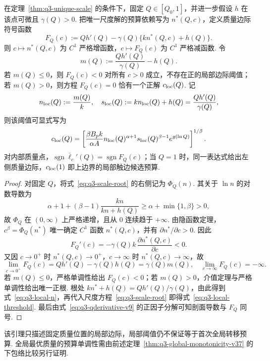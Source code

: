 \begin{lemma}[固定质量边际的预算单调性与局部阈值]\label{lem:q3-fixed-quality-threshold}
在定理~\ref{thm:q3-unique-scale} 的条件下，固定 $Q\in[Q_0,1]$，并进一步假设 $h$ 在该点可微且 $\gamma(Q)>0$. 把唯一尺度解的预算依赖写为 $n^*(Q,c)$，定义质量边际符号函数
\begin{equation}\label{eq:q3-fixed-q-margin}
F_Q(c):=Qh'(Q)-\gamma(Q)\{kn^*(Q,c)+h(Q)\}.
\end{equation}
则 $c\mapsto n^*(Q,c)$ 为 $C^1$ 严格增函数，$c\mapsto F_Q(c)$ 为 $C^1$ 严格减函数. 令
\begin{equation}\label{eq:q3-local-margin-m}
m(Q):=\frac{Qh'(Q)}{\gamma(Q)}-h(Q).
\end{equation}
若 $m(Q)\le0$，则 $F_Q(c)<0$ 对所有 $c>0$ 成立，不存在正的局部边际阈值；若 $m(Q)>0$，则方程 $F_Q(c)=0$ 恰有一个正解 $c_{\rm loc}(Q)$. 记
\begin{equation}\label{eq:q3-local-n}
n_{\rm loc}(Q):=\frac{m(Q)}k,\quad
s_{\rm loc}(Q):=kn_{\rm loc}(Q)+h(Q)=\frac{Qh'(Q)}{\gamma(Q)},
\end{equation}
则该阈值可显式写为
\begin{equation}\label{eq:q3-local-threshold}
c_{\rm loc}(Q)=\left[
\frac{\beta B_pk}{\alpha A}
 n_{\rm loc}(Q)^{\alpha+1}
 s_{\rm loc}(Q)^{\beta-1}
 e^{g(\ln Q)}
\right]^{1/\beta}.
\end{equation}
对内部质量点，$\operatorname{sgn}\bar\ell_c'(Q)=\operatorname{sgn}F_Q(c)$；当 $Q=1$ 时，同一表达式给出左侧质量边际，$c_{\rm loc}(1)$ 即上边界的局部触边候选预算. 
\end{lemma}
\begin{proof}
对固定 $Q$，将式~\eqref{eq:q3-scale-root} 的右侧记为 $\Phi_Q(n)$. 其关于 $\ln n$ 的对数导数为
\[
\alpha+1+(\beta-1)\frac{kn}{kn+h(Q)}
\ge \alpha+\min\{1,\beta\}>0,
\]
故 $\Phi_Q$ 在 $(0,\infty)$ 上严格递增，且从 $0$ 连续趋于 $+\infty$. 由隐函数定理，$c^\beta=\Phi_Q(n^*)$ 唯一确定 $C^1$ 函数 $n^*(Q,c)$，并有 $\partial n^*/\partial c>0$. 因此
\[
F_Q'(c)=-\gamma(Q)k\,\frac{\partial n^*(Q,c)}{\partial c}<0.
\]
又因 $c\to0^+$ 时 $n^*(Q,c)\to0^+$，$c\to\infty$ 时 $n^*(Q,c)\to\infty$，故
\[
\lim_{c\to0^+}F_Q(c)=Qh'(Q)-\gamma(Q)h(Q)=\gamma(Q)m(Q),\quad
\lim_{c\to\infty}F_Q(c)=-\infty.
\]
若 $m(Q)\le0$，严格单调性给出 $F_Q(c)<0$；若 $m(Q)>0$，介值定理与严格单调性给出唯一正根. 根处 $kn^*+h(Q)=Qh'(Q)/\gamma(Q)$，由此得到式~\eqref{eq:q3-local-n}，再代入尺度方程~\eqref{eq:q3-scale-root} 即得式~\eqref{eq:q3-local-threshold}. 最后由式~\eqref{eq:q3-qderivative-v9} 的正因子分解可知剖面导数与 $F_Q$ 同号. 
\end{proof}
该引理只描述固定质量位置的局部边际，局部阈值仍不保证等于首次全局转移预算. 全局最优质量的预算单调性需由前述定理~\ref{thm:q3-global-monotonicity-v37} 的下包络比较另行证明. 

